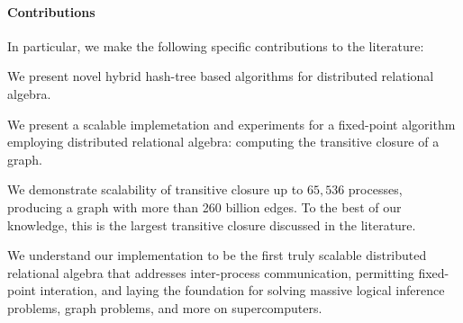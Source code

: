 \paragraph{Contributions} In particular, we make the following specific contributions to the literature:
\begin{tightenumerate}
	\item We present novel hybrid hash-tree based algorithms for distributed relational algebra.
	\item We present a scalable implemetation and experiments for a fixed-point algorithm employing distributed relational algebra: computing the transitive closure of a graph.
	\item We demonstrate scalability of transitive closure up to $65,\!536$ processes, producing a graph with more than 260 billion edges. To the best of our knowledge, this is the largest transitive closure discussed in the literature. 
\end{tightenumerate}

We understand our implementation to be the first truly scalable distributed relational algebra that addresses inter-process communication, permitting fixed-point interation, and laying the foundation for solving massive logical inference problems, graph problems, and more on supercomputers.


